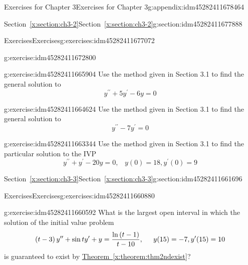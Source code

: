 \documentclass[oneside,10pt,]{book}
\numberwithin{equation}{section}
\numberwithin{equation}{section}
\begin{document}
\begin{appendixptx}{Exercises for Chapter 3}{}{Exercises for Chapter 3}{}{}{g:appendix:idm45282411678464}
\begin{sectionptx}{Section~\ref*{x:section:ch3-2}}{}{Section~\ref*{x:section:ch3-2}}{}{}{g:section:idm45282411677888}
\begin{exercises-subsection-numberless}{Exercises}{}{Exercises}{}{}{g:exercises:idm45282411677072}
\begin{divisionexercise}{2}{}{}{g:exercise:idm45282411672800}
\end{divisionexercise}%
\begin{divisionexercise}{3}{}{}{g:exercise:idm45282411665904}%
Use the method given in Section 3.1 to find the general solution to%
\begin{equation*}
y^{\prime\prime}+5y^{\prime}-6y=0
\end{equation*}
%
\end{divisionexercise}%
\begin{divisionexercise}{4}{}{}{g:exercise:idm45282411664624}%
Use the method given in Section 3.1 to find the general solution to%
\begin{equation*}
y^{\prime\prime}-7y^{\prime}=0
\end{equation*}
%
\end{divisionexercise}%
\begin{divisionexercise}{5}{}{}{g:exercise:idm45282411663344}%
Use the method given in Section 3.1 to find the particular solution to the IVP%
\begin{equation*}
y^{\prime\prime}+y^{\prime}-20y=0,\,\,\,\,\,y(0)=18,y^{\prime}(0)=9
\end{equation*}
%
\end{divisionexercise}%
\end{exercises-subsection-numberless}
\end{sectionptx}
%
%
\typeout{************************************************}
\typeout{************************************************}
%
\begin{sectionptx}{Section~\ref*{x:section:ch3-3}}{}{Section~\ref*{x:section:ch3-3}}{}{}{g:section:idm45282411661696}
%
%
\typeout{************************************************}
\typeout{************************************************}
%
\begin{exercises-subsection-numberless}{Exercises}{}{Exercises}{}{}{g:exercises:idm45282411660880}
\begin{divisionexercise}{1}{}{}{g:exercise:idm45282411660592}%
What is the largest open interval in which the solution of the initial value problem%
\begin{equation*}
\left(t-3\right)y^{\prime\prime}+\sin ty^{\prime}+y=\frac{\ln\left(t-1\right)}{t-10}, \hspace{.2in}
y(15)=-7,y^{\prime}(15)=10
\end{equation*}
is guaranteed to exist by \hyperref[x:theorem:thm2ndexist]{Theorem~\ref{x:theorem:thm2ndexist}}?%
\end{divisionexercise}%

\end{exercises-subsection-numberless}
\end{sectionptx}
\end{appendixptx}
\end{document}

